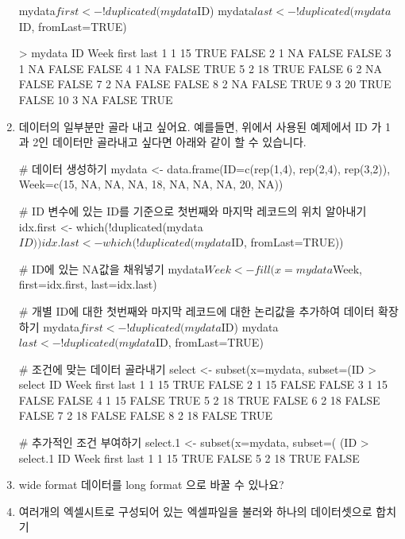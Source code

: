 \documentclass{article}
\begin{document}
\begin{enumerate}
\begin{Schunk}
\begin{Soutput}
mydata$first <- !duplicated(mydata$ID)
mydata$last <- !duplicated(mydata$ID, fromLast=TRUE)		

> mydata
   ID Week first  last
1   1   15  TRUE FALSE
2   1   NA FALSE FALSE
3   1   NA FALSE FALSE
4   1   NA FALSE  TRUE
5   2   18  TRUE FALSE
6   2   NA FALSE FALSE
7   2   NA FALSE FALSE
8   2   NA FALSE  TRUE
9   3   20  TRUE FALSE
10  3   NA FALSE  TRUE
	\end{Soutput}	
\end{Schunk}

\item 데이터의 일부분만 골라 내고 싶어요.  예를들면, 위에서 사용된 예제에서 ID 가 1과 2인 데이터만 골라내고 싶다면 아래와 같이 할 수 있습니다. 

\begin{Schunk}
\begin{Soutput}
# 데이터 생성하기
mydata <- data.frame(ID=c(rep(1,4), rep(2,4), rep(3,2)), Week=c(15, NA, NA, NA, 18, NA, NA, NA, 20, NA))

# ID 변수에 있는 ID를 기준으로 첫번째와 마지막 레코드의 위치 알아내기 
idx.first <- which(!duplicated(mydata$ID))
idx.last <- which(!duplicated(mydata$ID, fromLast=TRUE))

# ID에 있는 NA값을 채워넣기 
mydata$Week <- fill(x=mydata$Week, first=idx.first, last=idx.last)

# 개별 ID에 대한 첫번째와 마지막 레코드에 대한 논리값을 추가하여 데이터 확장하기 
mydata$first <- !duplicated(mydata$ID)
mydata$last <- !duplicated(mydata$ID, fromLast=TRUE)

# 조건에 맞는 데이터 골라내기 
select <- subset(x=mydata, subset=(ID %
> select
  ID Week first  last
1  1   15  TRUE FALSE
2  1   15 FALSE FALSE
3  1   15 FALSE FALSE
4  1   15 FALSE  TRUE
5  2   18  TRUE FALSE
6  2   18 FALSE FALSE
7  2   18 FALSE FALSE
8  2   18 FALSE  TRUE

# 추가적인 조건 부여하기
select.1 <- subset(x=mydata, subset=( (ID %
> select.1
  ID Week first  last
1  1   15  TRUE FALSE
5  2   18  TRUE FALSE
\end{Soutput}
\end{Schunk}

\item wide format 데이터를 long format 으로 바꿀 수 있나요? 


\item 여러개의 엑셀시트로 구성되어 있는 엑셀파일을 불러와 하나의 데이터셋으로 합치기


\end{enumerate}
\end{document}
